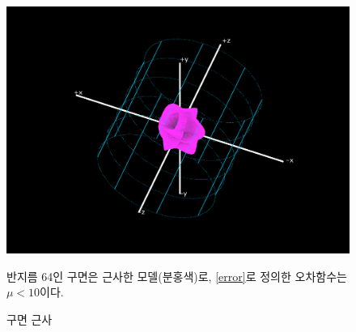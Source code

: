 \documentclass{gshs_thesis}
\theoremstyle{theorem}
\theoremstyle{lemma}
\theoremstyle{definition}
\begin{document}
\begin{figure}[h]
	\centering
	\includegraphics[width=\textwidth]{image/gg}
	\caption{구면 근사}
	\small 반지름 64인 구면은 근사한 모델(분홍색)로, \cref{error}로 정의한 오차함수는 $\mu<10$이다. 
\end{figure}
\end{document}
